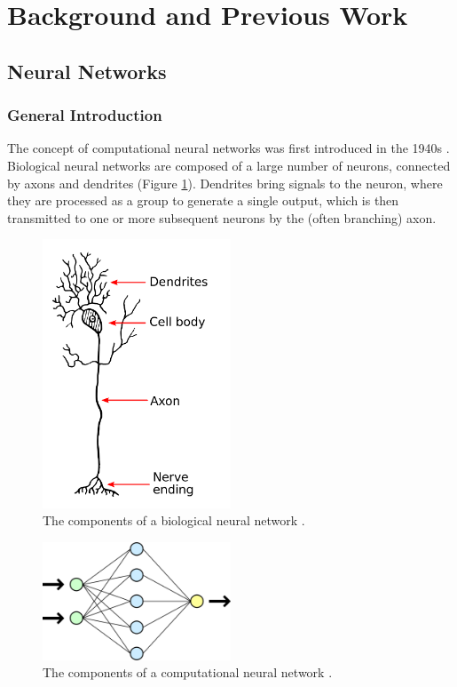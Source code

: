 \documentclass{article}
\begin{document}

\newpage

\section{Background and Previous Work}

\subsection{Neural Networks}

\subsubsection{General Introduction}

The concept of computational neural networks was first introduced in the 1940s \cite{McCulloch1943}. Biological neural networks are composed of a large number of neurons, connected by axons and dendrites (Figure \ref{fig:BioNN}). Dendrites bring signals to the neuron, where they are processed as a group to generate a single output, which is then transmitted to  one or more subsequent neurons by the (often branching) axon.

\begin{figure}
  \centering
  \includegraphics[width=0.5\textwidth]{Dendrite.png}
  \caption{The components of a biological neural network \cite{bionn}.}
  \label{fig:BioNN}
\end{figure}

\begin{figure}
  \centering
  \includegraphics[width=0.5\textwidth]{NeuralNetwork.png}
  \caption{The components of a computational neural network \cite{compnn}.}
  \label{fig:CompNN}
\end{figure}
\end{document}
